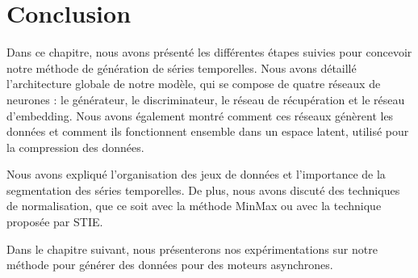 \section{Conclusion}
Dans ce chapitre, nous avons présenté les différentes étapes suivies pour
concevoir notre méthode de génération de séries temporelles. Nous avons
détaillé l'architecture globale de notre modèle, qui se compose de quatre
réseaux de neurones : le générateur, le discriminateur, le réseau de
récupération et le réseau d'embedding. Nous avons également montré comment ces
réseaux génèrent les données et comment ils fonctionnent ensemble dans un
espace latent, utilisé pour la compression des données.

Nous avons expliqué l'organisation des jeux de données et l'importance de la
segmentation des séries temporelles. De plus, nous avons discuté des techniques
de normalisation, que ce soit avec la méthode MinMax ou avec la technique
proposée par STIE.

Dans le chapitre suivant, nous présenterons nos expérimentations sur notre
méthode pour générer des données pour des moteurs asynchrones.